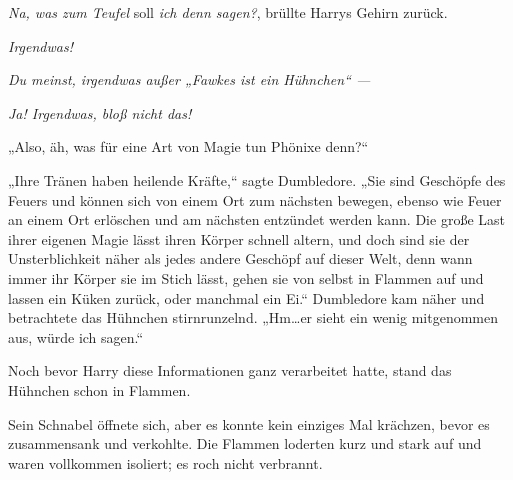 \emph{Na, was zum Teufel} soll \emph{ich denn sagen?}, brüllte Harrys Gehirn zurück.

\emph{Irgendwas!}

\emph{Du meinst, irgendwas außer „Fawkes ist ein Hühnchen“ —}

\emph{Ja! Irgendwas, bloß nicht das!}

„Also, äh, was für eine Art von Magie tun Phönixe denn?“

„Ihre Tränen haben heilende Kräfte,“ sagte Dumbledore. „Sie sind Geschöpfe des Feuers und können sich von einem Ort zum nächsten bewegen, ebenso wie Feuer an einem Ort erlöschen und am nächsten entzündet werden kann. Die große Last ihrer eigenen Magie lässt ihren Körper schnell altern, und doch sind sie der Unsterblichkeit näher als jedes andere Geschöpf auf dieser Welt, denn wann immer ihr Körper sie im Stich lässt, gehen sie von selbst in Flammen auf und lassen ein Küken zurück, oder manchmal ein Ei.“ Dumbledore kam näher und betrachtete das Hühnchen stirnrunzelnd. „Hm…er sieht ein wenig mitgenommen aus, würde ich sagen.“

Noch bevor Harry diese Informationen ganz verarbeitet hatte, stand das Hühnchen schon in Flammen.

Sein Schnabel öffnete sich, aber es konnte kein einziges Mal krächzen, bevor es zusammensank und verkohlte. Die Flammen loderten kurz und stark auf und waren vollkommen isoliert; es roch nicht verbrannt.

